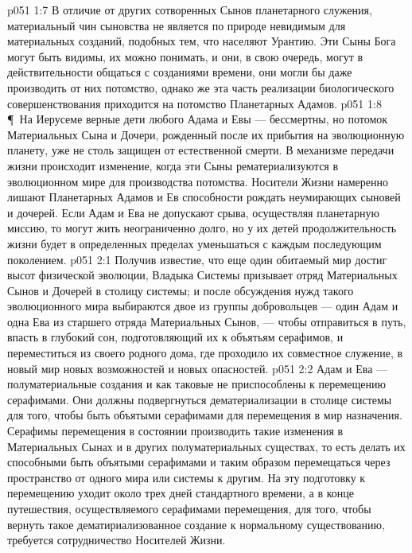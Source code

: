 \vs p051 1:7 В отличие от других сотворенных Сынов планетарного служения, материальный чин сыновства не является по природе невидимым для материальных созданий, подобных тем, что населяют Урантию. Эти Сыны Бога могут быть видимы, их можно понимать, и они, в свою очередь, могут в действительности общаться с созданиями времени, они могли бы даже производить от них потомство, однако же эта часть реализации биологического совершенствования приходится на потомство Планетарных Адамов.
\vs p051 1:8 \P\ На Иерусеме верные дети любого Адама и Евы --- бессмертны, но потомок Материальных Сына и Дочери, рожденный после их прибытия на эволюционную планету, уже не столь защищен от естественной смерти. В механизме передачи жизни происходит изменение, когда эти Сыны рематериализуются в эволюционном мире для производства потомства. Носители Жизни намеренно лишают Планетарных Адамов и Ев способности рождать неумирающих сыновей и дочерей. Если Адам и Ева не допускают срыва, осуществляя планетарную миссию, то могут жить неограниченно долго, но у их детей продолжительность жизни будет в определенных пределах уменьшаться с каждым последующим поколением.
\vs p051 2:1 Получив известие, что еще один обитаемый мир достиг высот физической эволюции, Владыка Системы призывает отряд Материальных Сынов и Дочерей в столицу системы; и после обсуждения нужд такого эволюционного мира выбираются двое из группы добровольцев --- один Адам и одна Ева из старшего отряда Материальных Сынов, --- чтобы отправиться в путь, впасть в глубокий сон, подготовляющий их к объятьям серафимов, и переместиться из своего родного дома, где проходило их совместное служение, в новый мир новых возможностей и новых опасностей.
\vs p051 2:2 Адам и Ева --- полуматериальные создания и как таковые не приспособлены к перемещению серафимами. Они должны подвергнуться дематериализации в столице системы для того, чтобы быть объятыми серафимами для перемещения в мир назначения. Серафимы перемещения в состоянии производить такие изменения в Материальных Сынах и в других полуматериальных существах, то есть делать их способными быть объятыми серафимами и таким образом перемещаться через пространство от одного мира или системы к другим. На эту подготовку к перемещению уходит около трех дней стандартного времени, а в конце путешествия, осуществляемого серафимами перемещения, для того, чтобы вернуть такое дематириализованное создание к нормальному существованию, требуется сотрудничество Носителей Жизни.
